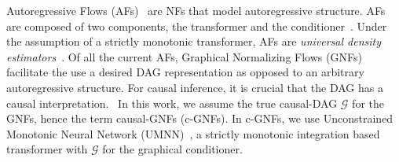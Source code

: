 \documentclass[letterpaper]{article} %
\begin{document}
Autoregressive Flows (AFs)~\cite{kingma2016IAF, Papamakarios2017MAF, Huang2018NAF} are NFs that model autoregressive structure.
AFs are composed of two components, the transformer and the conditioner~\cite{papamakarios2021NF_pmi}. Under the assumption of a strictly monotonic transformer, AFs are \emph{universal density estimators}~\cite{Huang2018NAF}. 
Of all the current AFs, Graphical Normalizing Flows (GNFs)~\cite{wehenkel2020GNF} facilitate the use a desired DAG representation as opposed to an arbitrary autoregressive structure. %
For causal inference, it is crucial that the DAG has a causal interpretation.%
~In this work, we assume the true causal-DAG $\mathcal{G}$ for the GNFs, hence the term causal-GNFs (c-GNFs). 
In c-GNFs, we use Unconstrained Monotonic Neural Network (UMNN)~\cite{wehenkel2019UMNN}, a strictly monotonic integration based transformer with $\mathcal{G}$ for the graphical conditioner.%
\end{document}
